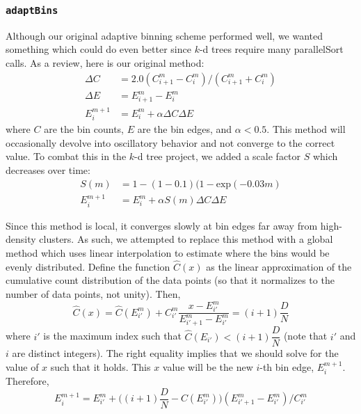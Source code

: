 \documentclass{article}
\begin{document}
\subsubsection{\texttt{adaptBins}}
Although our original adaptive binning scheme performed well, we wanted something which could do even better since $k$-d trees require many parallelSort calls. As a review, here is our original method:
\begin{equation}
	\begin{split}
		\Delta C & = 2.0 ( C^{m}_{i+1} - C^{m}_i ) / ( C^{m}_{i+1} + C^{m}_i ) \\
		\Delta E & = E^m_{i+1} - E^m_i \\
		E^{m+1}_i & = E^m_i + \alpha \Delta C \Delta E
	\end{split}
\end{equation}
where $C$ are the bin counts, $E$ are the bin edges, and $\alpha < 0.5$. This method will occasionally devolve into oscillatory behavior and not converge to the correct value. To combat this in the $k$-d tree project, we added a scale factor $S$ which decreases over time:
\begin{equation}
	\begin{split}
		S(m) & = 1 - (1 - 0.1) (1 - \textrm{exp}(-0.03 m) \\
		E^{m+1}_i & = E^m_i + \alpha S(m) \Delta C \Delta E
	\end{split}
\end{equation}

Since this method is local, it converges slowly at bin edges far away from high-density clusters. As such, we attempted to replace this method with a global method which uses linear interpolation to estimate where the bins would be evenly distributed. Define the function $\hat C(x)$ as the linear approximation of the cumulative count distribution of the data points (so that it normalizes to the number of data points, not unity). Then,
\begin{equation}
		\hat C(x) = \hat C(E^m_{i'}) + C^m_{i'} \dfrac{x - E^m_{i'}}{E^m_{{i'}+1} - E^m_{i'}} = (i+1) \dfrac{D}{N}
\end{equation}
where $i'$ is the maximum index such that $\hat C(E_{i'}) < (i+1) \dfrac{D}{N}$ (note that $i'$ and $i$ are distinct integers). The right equality implies that we should solve for the value of $x$ such that it holds. This $x$ value will be the new $i$-th bin edge, $E^{m+1}_i$. Therefore,
\begin{equation}
		E^{m+1}_i = E^m_{i'} + \Big( (i+1) \dfrac{D}{N} - C(E^m_{i'}) \Big) (E^m_{{i'}+1} - E^m_{i'}) / C^m_{i'}
\end{equation}
\end{document}
